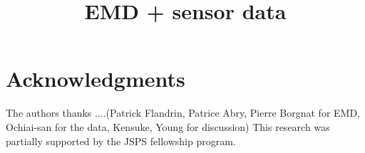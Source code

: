 \documentclass[conference]{IEEEtran}
\begin{document}
\title{EMD + sensor data}


\author{
\and
{}
\and
{}
}



\maketitle

% 
% 










\section*{Acknowledgments}
The authors thanks ....(Patrick Flandrin, Patrice Abry, Pierre Borgnat for EMD, Ochiai-san for the data, Kensuke, Young for discussion)
This research was partially supported by the JSPS fellowship program.



\end{document}
